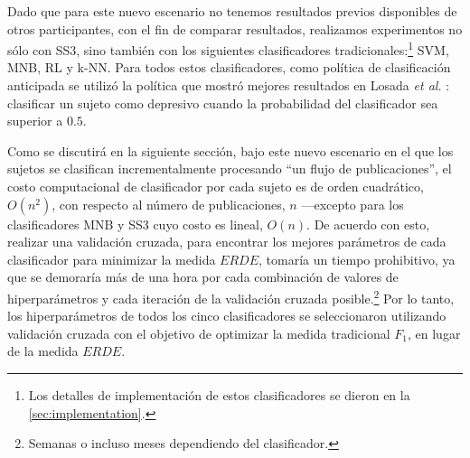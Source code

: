 Dado que para este nuevo escenario no tenemos resultados previos disponibles de otros participantes, con el fin de comparar resultados, realizamos experimentos no sólo con SS3, sino también con los siguientes clasificadores tradicionales:\footnote{Los detalles de implementación de estos clasificadores se dieron en la \autoref{sec:implementation}.} \ac{SVM}, \ac{MNB}, \ac{RL} y \ac{k-NN}. Para todos estos clasificadores, como política de clasificación anticipada se utilizó la política que mostró mejores resultados en Losada \emph{et al.} \cite{losada2016test}: clasificar un sujeto como depresivo cuando la probabilidad del clasificador sea superior a $0.5$.

Como se discutirá en la siguiente sección, bajo este nuevo escenario en el que los sujetos se clasifican incrementalmente procesando ``un flujo de publicaciones'', el costo computacional de clasificador por cada sujeto es de orden cuadrático, $O(n^2)$, con respecto al número de publicaciones, $n$ ---excepto para los clasificadores \ac{MNB} y SS3 cuyo costo es lineal, $O(n)$.
De acuerdo con esto, realizar una validación cruzada, para encontrar los mejores parámetros de cada clasificador para minimizar la medida $ERDE$, tomaría un tiempo prohibitivo, ya que se demoraría más de una hora por cada combinación de valores de hiperparámetros y cada iteración de la validación cruzada posible.\footnote{Semanas o incluso meses dependiendo del clasificador.} Por lo tanto, los hiperparámetros de todos los cinco clasificadores se seleccionaron utilizando validación cruzada con el objetivo de optimizar la medida tradicional $F_1$, en lugar de la medida $ERDE$.

